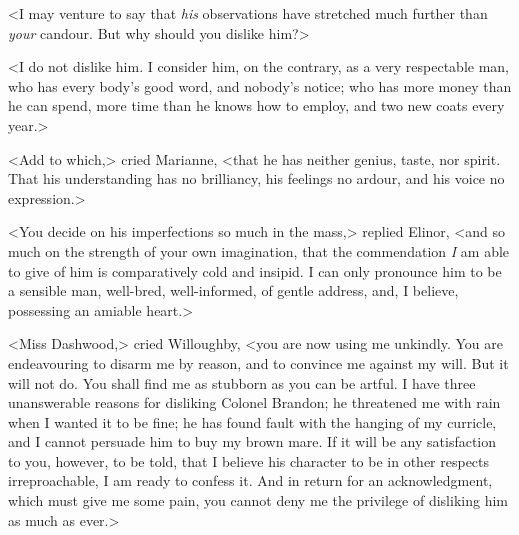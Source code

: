 <I may venture to say that \textit{his} observations have stretched much further than \textit{your} candour. But why should you dislike him?>

<I do not dislike him. I consider him, on the contrary, as a very respectable man, who has every body's good word, and nobody's notice; who has more money than he can spend, more time than he knows how to employ, and two new coats every year.>

<Add to which,> cried Marianne, <that he has neither genius, taste, nor spirit. That his understanding has no brilliancy, his feelings no ardour, and his voice no expression.>

<You decide on his imperfections so much in the mass,> replied Elinor, <and so much on the strength of your own imagination, that the commendation \textit{I} am able to give of him is comparatively cold and insipid. I can only pronounce him to be a sensible man, well-bred, well-informed, of gentle address, and, I believe, possessing an amiable heart.>

<Miss Dashwood,> cried Willoughby, <you are now using me unkindly. You are endeavouring to disarm me by reason, and to convince me against my will. But it will not do. You shall find me as stubborn as you can be artful. I have three unanswerable reasons for disliking Colonel Brandon; he threatened me with rain when I wanted it to be fine; he has found fault with the hanging of my curricle, and I cannot persuade him to buy my brown mare. If it will be any satisfaction to you, however, to be told, that I believe his character to be in other respects irreproachable, I am ready to confess it. And in return for an acknowledgment, which must give me some pain, you cannot deny me the privilege of disliking him as much as ever.>